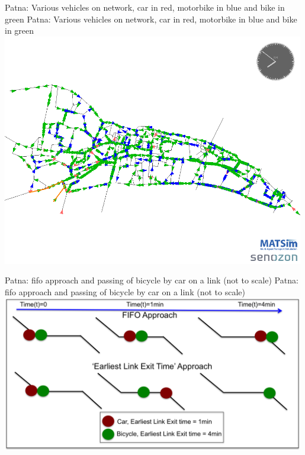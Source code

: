 \createfigure%
{Patna: Various vehicles on network, car in red, motorbike in blue and bike in green}%
{Patna: Various vehicles on network, car in red, motorbike in blue and bike in green}%
{\label{fig:patna0}}%
{\includegraphics[width=0.99\textwidth, angle=0]{scenarios/figures/vehiclesOnNetwork}}%
{}

\createfigure%
{Patna: \protect\gls{fifo} approach and passing of bicycle by car on a link (not to scale)}%
{Patna: \protect\gls{fifo} approach and passing of bicycle by car on a link (not to scale)}%
{\label{fig:patna1}}%
{\includegraphics[width=0.99\textwidth, angle=0]{scenarios/figures/FIFOandPassing}}%
{}


